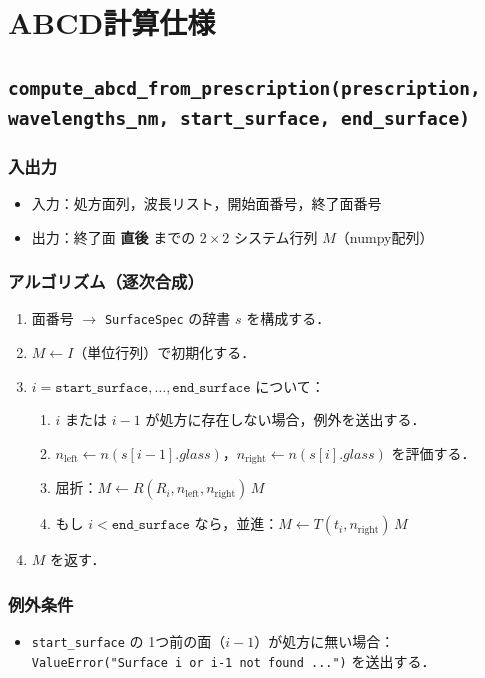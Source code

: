 \documentclass[a4paper,11pt]{jsarticle} %
\begin{document}
\section{ABCD計算仕様}
\subsection{\texttt{compute\_abcd\_from\_prescription(prescription, wavelengths\_nm, start\_surface, end\_surface)}}
\subsubsection{入出力}
\begin{itemize}
  \item 入力：処方面列，波長リスト，開始面番号，終了面番号
  \item 出力：終了面 \textbf{直後} までの $2\times2$ システム行列 $M$（numpy配列）
\end{itemize}

\subsubsection{アルゴリズム（逐次合成）}
\begin{enumerate}
  \item 面番号 $\rightarrow$ \texttt{SurfaceSpec} の辞書 $s$ を構成する．
  \item $M \leftarrow I$（単位行列）で初期化する．
  \item $i=\texttt{start\_surface},\dots,\texttt{end\_surface}$ について：
    \begin{enumerate}
      \item $i$ または $i-1$ が処方に存在しない場合，例外を送出する．
      \item $n_{\text{left}}\leftarrow n(s[i-1].glass)$，$n_{\text{right}}\leftarrow n(s[i].glass)$ を評価する．
      \item 屈折：$M \leftarrow R(R_i,n_{\text{left}},n_{\text{right}})\, M$
      \item もし $i<\texttt{end\_surface}$ なら，並進：$M \leftarrow T(t_i,n_{\text{right}})\, M$
    \end{enumerate}
  \item $M$ を返す．
\end{enumerate}

\subsubsection{例外条件}
\begin{itemize}
  \item \texttt{start\_surface} の 1つ前の面（$i-1$）が処方に無い場合：
        \texttt{ValueError("Surface i or i-1 not found ...")} を送出する．
\end{itemize}
\end{document}
